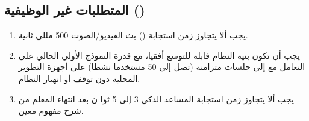 \subsection{المتطلبات غير الوظيفية ()}

\begin{enumerate}
  \item يجب ألا يتجاوز زمن استجابة () بث الفيديو/الصوت 500 مللي ثانية.
  \item يجب أن تكون بنية النظام قابلة للتوسع أفقيا، مع قدرة النموذج الأولي الحالي على التعامل مع إلى جلسات متزامنة (تصل إلى 50 مستخدما نشطا) على أجهزة التطوير المحلية دون توقف أو انهيار النظام.
  \item يجب ألا يتجاوز زمن استجابة المساعد الذكي 3 إلى 5 ثوا ن بعد انتهاء المعلم من شرح مفهوم معين.
\end{enumerate}
